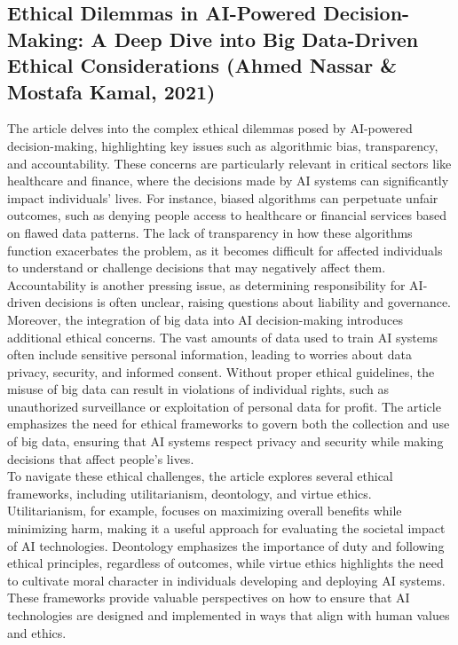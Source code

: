 \documentclass[a4paper, 12pt]{article}
\begin{document}
\subsection{Ethical Dilemmas in AI-Powered Decision-Making: A Deep Dive into Big Data-Driven Ethical Considerations (Ahmed Nassar & Mostafa Kamal,  2021)}
The article delves into the complex ethical dilemmas posed by AI-powered decision-making, highlighting key issues such as algorithmic bias, transparency, and accountability. These concerns are particularly relevant in critical sectors like healthcare and finance, where the decisions made by AI systems can significantly impact individuals' lives. For instance, biased algorithms can perpetuate unfair outcomes, such as denying people access to healthcare or financial services based on flawed data patterns. The lack of transparency in how these algorithms function exacerbates the problem, as it becomes difficult for affected individuals to understand or challenge decisions that may negatively affect them. Accountability is another pressing issue, as determining responsibility for AI-driven decisions is often unclear, raising questions about liability and governance.\\

Moreover, the integration of big data into AI decision-making introduces additional ethical concerns. The vast amounts of data used to train AI systems often include sensitive personal information, leading to worries about data privacy, security, and informed consent. Without proper ethical guidelines, the misuse of big data can result in violations of individual rights, such as unauthorized surveillance or exploitation of personal data for profit. The article emphasizes the need for ethical frameworks to govern both the collection and use of big data, ensuring that AI systems respect privacy and security while making decisions that affect people’s lives.\\

To navigate these ethical challenges, the article explores several ethical frameworks, including utilitarianism, deontology, and virtue ethics. Utilitarianism, for example, focuses on maximizing overall benefits while minimizing harm, making it a useful approach for evaluating the societal impact of AI technologies. Deontology emphasizes the importance of duty and following ethical principles, regardless of outcomes, while virtue ethics highlights the need to cultivate moral character in individuals developing and deploying AI systems. These frameworks provide valuable perspectives on how to ensure that AI technologies are designed and implemented in ways that align with human values and ethics.\\
\end{document}
